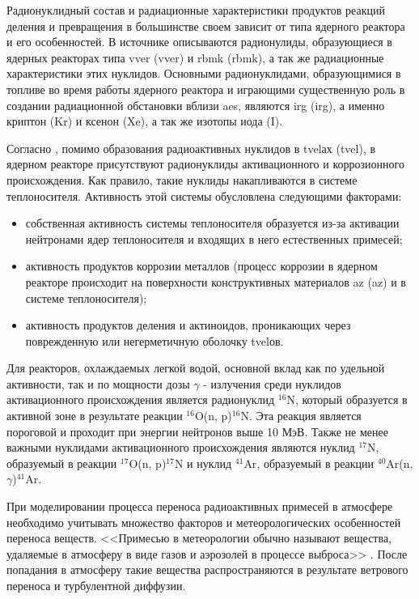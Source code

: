 Радионуклидный состав и радиационные характеристики продуктов реакций деления и превращения в большинстве своем зависит 
от типа ядерного реактора и его особенностей. В источнике \cite{gusev_bio} описываются радионулиды, образующиеся в 
ядерных реакторах типа \ac{vver} (\acl{vver}) и \ac{rbmk} (\acl{rbmk}), а так же радиационные характеристики этих 
нуклидов. Основными радионуклидами, образующимися в топливе во время работы ядерного реактора и играющими существенную 
роль в создании радиационной обстановки вблизи \ac{aes}, являются \ac{irg} (\acl{irg}), а именно криптон (Kr) и ксенон 
(Xe), а так же изотопы иода (I).

Согласно \cite{gusev_bio, gusev_def, egorov}, помимо образования радиоактивных нуклидов в \ac{tvel}ах (\acl{tvel}), 
в ядерном реакторе присутствуют радионуклиды активационного и коррозионного происхождения. Как правило, такие нуклиды 
накапливаются в системе теплоносителя. Активность этой системы обусловлена следующими факторами:

\begin{itemize}
	\item собственная активность системы теплоносителя образуется из-за активации нейтронами ядер теплоносителя и 
		входящих в него естественных примесей;
	\item активность продуктов коррозии металлов (процесс коррозии в ядерном реакторе происходит на поверхности 
		конструктивных материалов \ac{az} (\acl{az}) и в системе теплоносителя);
	\item активность продуктов деления и актиноидов, проникающих через поврежденную или негерметичную оболочку 
		\ac{tvel}ов.
\end{itemize}
Для реакторов, охлаждаемых легкой водой, основной вклад как по удельной активности, так и по мощности дозы $\gamma$ - 
излучения среди нуклидов активационного происхождения является радионуклид $^{16}\text{N}$, который образуется в
активной зоне в результате реакции $^{16}\text{O}$(n, p)$^{16}\text{N}$. Эта реакция является 
пороговой и проходит при энергии нейтронов выше 10 МэВ. Также не менее важными нуклидами активационного происхождения 
являются нуклид $^{17}\text{N}$, образуемый в реакции $^{17}\text{O}$(n, p)$^{17}\text{N}$ и нуклид $^{41}\text{Ar}$, 
образуемый в реакции $^{40}\text{Ar}$(n, $\gamma$)$^{41}\text{Ar}$.

При моделировании процесса переноса радиоактивных примесей в атмосфере необходимо учитывать множество факторов и 
метеорологических особенностей переноса веществ. <<Примесью в метеорологии обычно называют вещества, удаляемые в 
атмосферу в виде газов и  аэрозолей в процессе выброса>> \cite[с. 52]{gusev_bio}. После попадания в атмосферу такие 
вещества распространяются в результате ветрового переноса и турбулентной диффузии. 


